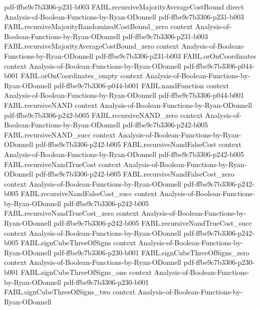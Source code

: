 \begin{theorem}
  {pdf-ffbe9c7b3306-p231-b003}
\proofstep
  {FABL.recursiveMajorityAverageCostBound}
  {direct}
  {Analysis-of-Boolean-Functions-by-Ryan-ODonnell}
  {pdf-ffbe9c7b3306-p231-b003}
\proofstep
  {FABL.recursiveMajorityRandomizedCostBound_zero}
  {context}
  {Analysis-of-Boolean-Functions-by-Ryan-ODonnell}
  {pdf-ffbe9c7b3306-p231-b003}
\proofstep
  {FABL.recursiveMajorityAverageCostBound_zero}
  {context}
  {Analysis-of-Boolean-Functions-by-Ryan-ODonnell}
  {pdf-ffbe9c7b3306-p231-b003}
\proofstep
  {FABL.orOnCoordinates}
  {context}
  {Analysis-of-Boolean-Functions-by-Ryan-ODonnell}
  {pdf-ffbe9c7b3306-p044-b001}
\proofstep
  {FABL.orOnCoordinates_empty}
  {context}
  {Analysis-of-Boolean-Functions-by-Ryan-ODonnell}
  {pdf-ffbe9c7b3306-p044-b001}
\proofstep
  {FABL.nandFunction}
  {context}
  {Analysis-of-Boolean-Functions-by-Ryan-ODonnell}
  {pdf-ffbe9c7b3306-p044-b001}
\proofstep
  {FABL.recursiveNAND}
  {context}
  {Analysis-of-Boolean-Functions-by-Ryan-ODonnell}
  {pdf-ffbe9c7b3306-p242-b005}
\proofstep
  {FABL.recursiveNAND_zero}
  {context}
  {Analysis-of-Boolean-Functions-by-Ryan-ODonnell}
  {pdf-ffbe9c7b3306-p242-b005}
\proofstep
  {FABL.recursiveNAND_succ}
  {context}
  {Analysis-of-Boolean-Functions-by-Ryan-ODonnell}
  {pdf-ffbe9c7b3306-p242-b005}
\proofstep
  {FABL.recursiveNandFalseCost}
  {context}
  {Analysis-of-Boolean-Functions-by-Ryan-ODonnell}
  {pdf-ffbe9c7b3306-p242-b005}
\proofstep
  {FABL.recursiveNandTrueCost}
  {context}
  {Analysis-of-Boolean-Functions-by-Ryan-ODonnell}
  {pdf-ffbe9c7b3306-p242-b005}
\proofstep
  {FABL.recursiveNandFalseCost_zero}
  {context}
  {Analysis-of-Boolean-Functions-by-Ryan-ODonnell}
  {pdf-ffbe9c7b3306-p242-b005}
\proofstep
  {FABL.recursiveNandFalseCost_succ}
  {context}
  {Analysis-of-Boolean-Functions-by-Ryan-ODonnell}
  {pdf-ffbe9c7b3306-p242-b005}
\proofstep
  {FABL.recursiveNandTrueCost_zero}
  {context}
  {Analysis-of-Boolean-Functions-by-Ryan-ODonnell}
  {pdf-ffbe9c7b3306-p242-b005}
\proofstep
  {FABL.recursiveNandTrueCost_succ}
  {context}
  {Analysis-of-Boolean-Functions-by-Ryan-ODonnell}
  {pdf-ffbe9c7b3306-p242-b005}
\proofstep
  {FABL.signCubeThreeOfSigns}
  {context}
  {Analysis-of-Boolean-Functions-by-Ryan-ODonnell}
  {pdf-ffbe9c7b3306-p230-b001}
\proofstep
  {FABL.signCubeThreeOfSigns_zero}
  {context}
  {Analysis-of-Boolean-Functions-by-Ryan-ODonnell}
  {pdf-ffbe9c7b3306-p230-b001}
\proofstep
  {FABL.signCubeThreeOfSigns_one}
  {context}
  {Analysis-of-Boolean-Functions-by-Ryan-ODonnell}
  {pdf-ffbe9c7b3306-p230-b001}
\proofstep
  {FABL.signCubeThreeOfSigns_two}
  {context}
  {Analysis-of-Boolean-Functions-by-Ryan-ODonnell}

\end{theorem}
